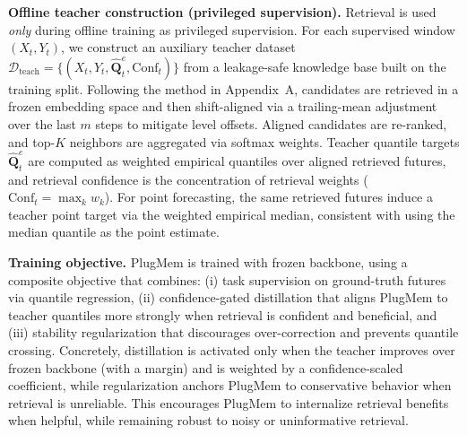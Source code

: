\noindent\textbf{Offline teacher construction (privileged supervision).}
Retrieval is used \emph{only} during offline training as privileged supervision.
For each supervised window $(X_t,Y_t)$, we construct an auxiliary teacher dataset
$\mathcal{D}_{\text{teach}}=\{(X_t,Y_t,\widehat{\mathbf{Q}}^{e}_t,\text{Conf}_t)\}$
from a leakage-safe knowledge base built on the training split.
Following the method in Appendix~A, candidates are retrieved in a frozen embedding space and then shift-aligned via a trailing-mean adjustment over the last $m$ steps to mitigate level offsets.
Aligned candidates are re-ranked, and top-$K$ neighbors are aggregated via softmax weights.
Teacher quantile targets $\widehat{\mathbf{Q}}^{e}_t$ are computed as weighted empirical quantiles over aligned retrieved futures, and retrieval confidence is the concentration of retrieval weights ($\text{Conf}_t=\max_k w_k$).
For point forecasting, the same retrieved futures induce a teacher point target via the weighted empirical median, consistent with using the median quantile as the point estimate.

\noindent\textbf{Training objective.}
PlugMem is trained with frozen backbone, using a composite objective that combines: (i) task supervision on ground-truth futures via quantile regression, (ii) confidence-gated distillation that aligns PlugMem to teacher quantiles more strongly when retrieval is confident and beneficial, and (iii) stability regularization that discourages over-correction and prevents quantile crossing.
Concretely, distillation is activated only when the teacher improves over frozen backbone (with a margin) and is weighted by a confidence-scaled coefficient, while regularization anchors PlugMem to conservative behavior when retrieval is unreliable.
This encourages PlugMem to internalize retrieval benefits when helpful, while remaining robust to noisy or uninformative retrieval.

